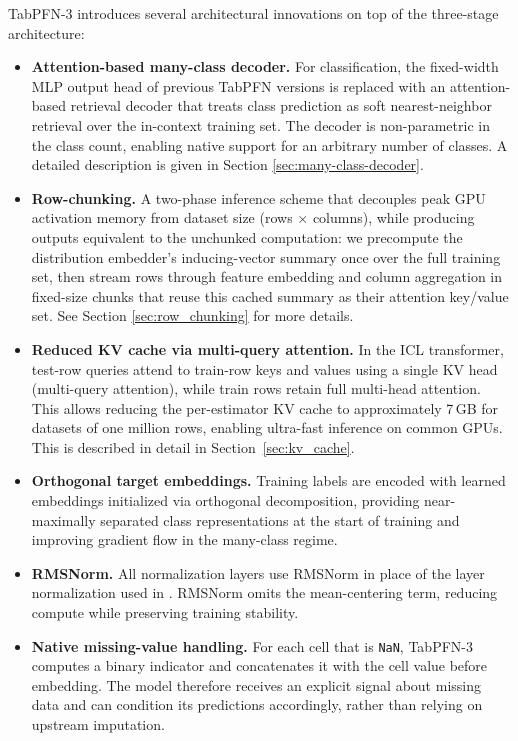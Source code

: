 TabPFN-3 introduces several architectural innovations on top of the three-stage architecture: 

\begin{itemize}
    \item \textbf{Attention-based many-class decoder.}
    For classification, the fixed-width MLP output head of previous TabPFN versions is replaced with an attention-based retrieval decoder that treats class prediction as soft nearest-neighbor retrieval over the in-context training set.
    The decoder is non-parametric in the class count, enabling native support for an arbitrary number of classes. 
    A detailed description is given in Section \ref{sec:many-class-decoder}.


    \item \textbf{Row-chunking.} A two-phase inference scheme that decouples peak GPU activation memory from dataset size (rows $\times$ columns), while producing outputs equivalent to the unchunked computation: we precompute the distribution embedder's inducing-vector summary once over the full training set, then stream rows through feature embedding and column aggregation in fixed-size chunks that reuse this cached summary as their attention key/value set. See Section \ref{sec:row_chunking} for more details.
    
    \item \textbf{Reduced KV cache via multi-query attention.}
    In the ICL transformer, test-row queries attend to train-row keys and values using a single KV head (multi-query attention), while train rows retain full multi-head attention.
    This allows reducing the per-estimator KV cache to approximately 7\,GB for datasets of one million rows, enabling ultra-fast inference on common GPUs. This is described in detail in Section~\ref{sec:kv_cache}.


    \item \textbf{Orthogonal target embeddings.}
    Training labels are encoded with learned embeddings initialized via orthogonal decomposition, providing near-maximally separated class representations at the start of training and improving gradient flow in the many-class regime.

    \item \textbf{RMSNorm.}
    All normalization layers use RMSNorm in place of the layer normalization used in \ourmodeltwofive. RMSNorm omits the mean-centering term, reducing compute while preserving training stability.

    \item \textbf{Native missing-value handling.}
    For each cell that is \texttt{NaN}, TabPFN-3 computes a binary indicator and concatenates it with the cell value before embedding. The model therefore receives an explicit signal about missing data and can condition its predictions accordingly, rather than relying on upstream imputation.
\end{itemize}

